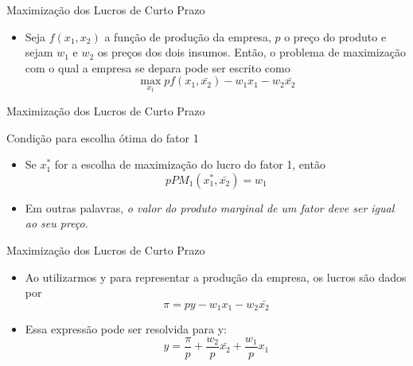 \documentclass[aspectratio=169]{beamer}
\begin{document}
\begin{frame}{Maximização dos Lucros de Curto Prazo}

\begin{block}{ }

\begin{itemize}
    \item Seja $f(x_1,x_2)$ a função de produção da empresa, $p$ o preço do produto e sejam $w_1$ e $w_2$ os preços dos dois insumos. Então, o problema de maximização com o qual a empresa se depara pode ser escrito como $$\max_{x_1} pf(x_1,\bar{x_2}) - w_1 x_1 - w_2 \bar{x_2} $$
    
\end{itemize}

\end{block}
\end{frame}

\begin{frame}{Maximização dos Lucros de Curto Prazo}

\begin{block}{Condição para escolha ótima do fator 1}

\begin{itemize}
    \item Se $x^*_1$ for a escolha de maximização do lucro do fator 1, então $$pPM_1 (x_1^*, \bar{x_2}) = w_1$$ 
    \item Em outras palavras, \textit{o valor do produto marginal de um fator deve ser igual ao seu preço}.
\end{itemize}

\end{block}
\end{frame}

\begin{frame}{Maximização dos Lucros de Curto Prazo}

\begin{block}{ }

\begin{itemize}
    \item Ao utilizarmos y para representar a produção da empresa, os lucros são dados por $$\pi = py - w_1 x_1 - w_2 \bar{x_2}$$
    \item Essa expressão pode ser resolvida para y: $$ y = \frac{\pi}{p} + \frac{w_2}{p} \bar{x_2} + \frac{w_1}{p} x_1$$
\end{itemize}

\end{block}
\end{frame}
\end{document}

